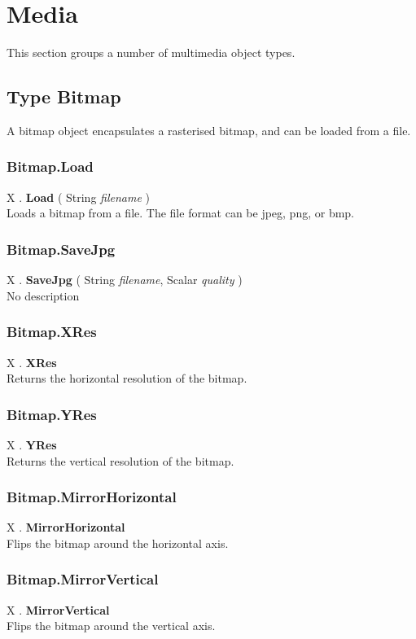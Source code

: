\section{Media \label{Media}}
This section groups a number of multimedia object types.

\subsection{Type Bitmap \label{T:Bitmap}}
A bitmap object encapsulates a rasterised bitmap, and can be loaded from a file.

\subsubsection{Bitmap.Load \label{F:Bitmap:Load}}
X . \textbf{Load} ( String \textit{filename} ) \\
Loads a bitmap from a file. The file format can be jpeg, png, or bmp.

\subsubsection{Bitmap.SaveJpg \label{F:Bitmap:SaveJpg}}
X . \textbf{SaveJpg} ( String \textit{filename}, Scalar \textit{quality} ) \\
No description

\subsubsection{Bitmap.XRes \label{F:Bitmap:XRes}}
X . \textbf{XRes} \\
Returns the horizontal resolution of the bitmap.

\subsubsection{Bitmap.YRes \label{F:Bitmap:YRes}}
X . \textbf{YRes} \\
Returns the vertical resolution of the bitmap.


\subsubsection{Bitmap.MirrorHorizontal \label{F:Bitmap:MirrorHorizontal}}
X . \textbf{MirrorHorizontal} \\
Flips the bitmap around the horizontal axis.

\subsubsection{Bitmap.MirrorVertical \label{F:Bitmap:MirrorVertical}}
X . \textbf{MirrorVertical} \\
Flips the bitmap around the vertical axis.

